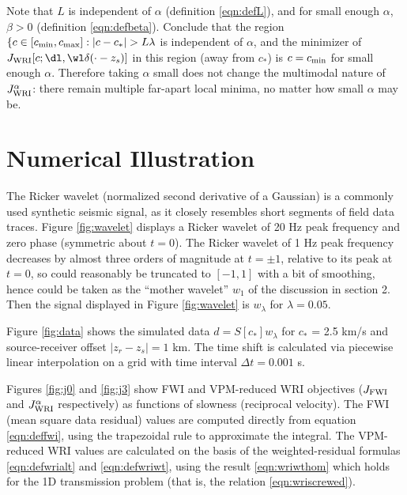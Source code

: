 Note that $L$ is independent of $\alpha$ (definition \ref{eqn:defL}),
and for small enough $\alpha$, $\beta > 0$ (definition
\ref{eqn:defbeta}). Conclude that the region $\{c \in [c_{\rm min},
c_{\rm max}]: |c-c_*| > L\lambda$ is
independent of $\alpha$, and the minimizer of
$J_{\rm WRI}[c;\dl,\wl\delta(\cdot-z_s)]$ in this region (away from
$c_*$) is $c=c_{\rm min}$ for small enough $\alpha$. Therefore taking
$\alpha$ small does not change the multimodal nature of
$J_{\rm WRI}^{\alpha}$: there remain multiple far-apart local minima,
no matter how small $\alpha$ may be.

\section{Numerical Illustration}
The Ricker wavelet (normalized second derivative of a Gaussian) is a
commonly used synthetic seismic signal, as it closely resembles short
segments of field data traces. Figure \ref{fig:wavelet} displays a Ricker
wavelet of 20 Hz peak frequency and zero phase
(symmetric about $t=0$). The Ricker wavelet
of 1 Hz peak frequency decreases by almost three orders of magnitude at $t=\pm
1$, relative to its peak at $t=0$, so could reasonably be truncated to
$[-1,1]$ with a bit of smoothing, hence could be taken as the ``mother
wavelet'' $w_1$ of the discussion in section 2. Then the signal
displayed in Figure \ref{fig:wavelet} is $w_{\lambda}$ for $\lambda=0.05$.

Figure \ref{fig:data} shows the simulated data $d=S[c_*]w_{\lambda}$
for $c_*$ = 2.5 km/s and source-receiver offset $|z_r-z_s|=1$ km. The
time shift is calculated via piecewise linear interpolation on a grid
with time interval $\Delta t = 0.001$ s.

Figures \ref{fig:j0} and \ref{fig:j3} show FWI and VPM-reduced WRI
objectives ($J_{\rm FWI}$ and $J_{\rm WRI}^{\alpha}$ respectively) as functions of slowness
(reciprocal velocity). The FWI (mean square data residual) values are
computed directly from equation \ref{eqn:deffwi}, using the
trapezoidal rule to approximate the integral. The VPM-reduced WRI
values are calculated on the basis of the weighted-residual formulas
\ref{eqn:defwrialt} and \ref{eqn:defwriwt}, using the result
\ref{eqn:wriwthom} which holds for the 1D transmission problem (that
is, the relation \ref{eqn:wriscrewed}).

